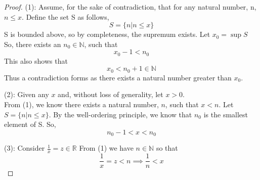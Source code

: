 \documentclass[12pt,reqno]{amsart}
\theoremstyle{plain}
\begin{document}
    \begin{proof} \hfill
        
        (1): Assume, for the sake of contradiction, that for any natural number, n, $n \le x$.
        Define the set S as follows,
        \[ S = \{ n \vert n \le x \} \]
        S is bounded above, so by completeness, the supremum exists.
        Let $x_0 = \sup S$
        So, there exists an $n_0 \in \mathbb{N}$, such that 
        \[ x_0 - 1 < n_0 \]
        This also shows that 
        \[ x_0 < n_0 + 1 \in \mathbb{N} \]
        Thus a contradiction forms as there exists a natural number greater than $x_0$.
        
        (2): Given any $x$ and, without loss of generality, let $x > 0$. \\
        From (1), we know there exists a natural number, $n$, such that $x < n$.
        Let $S = \{ n \vert n \le x \}$. 
        By the well-ordering principle, we know that $n_0$ is the smallest element of S. 
        So,
        \[ n_0 - 1 < x < n_0 \]

        (3): Consider $\frac1x = z \in \mathbb{R}$
        From (1) we have $n \in \mathbb{N}$ so that 
        \[ \frac1x = z < n \implies \frac1n < x \] 

    \end{proof}
\end{document}
